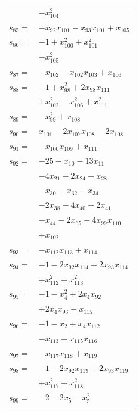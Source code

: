 \begin{longtable}{@{}r@{\;}l@{}}
 & \(\displaystyle -x_{104}^{2}\) \\[3pt]
\(s_{85}=\) & \(\displaystyle -x_{92}x_{101} -x_{93}x_{101} +x_{105}\) \\[3pt]
\(s_{86}=\) & \(\displaystyle -1 +x_{100}^{2} +x_{101}^{2}\) \\
 & \(\displaystyle -x_{105}^{2}\) \\[3pt]
\(s_{87}=\) & \(\displaystyle -x_{102} -x_{102}x_{103} +x_{106}\) \\[3pt]
\(s_{88}=\) & \(\displaystyle -1 +x_{98}^{2} +2x_{98}x_{111}\) \\
 & \(\displaystyle +x_{102}^{2} -x_{106}^{2} +x_{111}^{2}\) \\[3pt]
\(s_{89}=\) & \(\displaystyle -x_{99}^{2} +x_{108}\) \\[3pt]
\(s_{90}=\) & \(\displaystyle x_{101} -2x_{107}x_{108} -2x_{108}\) \\[3pt]
\(s_{91}=\) & \(\displaystyle -x_{100}x_{109} +x_{111}\) \\[3pt]
\(s_{92}=\) & \(\displaystyle -25 -x_{10} -13x_{11}\) \\
 & \(\displaystyle -4x_{21} -2x_{24} -x_{28}\) \\
 & \(\displaystyle -x_{30} -x_{32} -x_{34}\) \\
 & \(\displaystyle -2x_{38} -4x_{40} -2x_{41}\) \\
 & \(\displaystyle -x_{44} -2x_{65} -4x_{99}x_{110}\) \\
 & \(\displaystyle +x_{102}\) \\[3pt]
\(s_{93}=\) & \(\displaystyle -x_{112}x_{113} +x_{114}\) \\[3pt]
\(s_{94}=\) & \(\displaystyle -1 -2x_{92}x_{114} -2x_{93}x_{114}\) \\
 & \(\displaystyle +x_{112}^{2} +x_{113}^{2}\) \\[3pt]
\(s_{95}=\) & \(\displaystyle -1 -x_{4}^{2} +2x_{4}x_{92}\) \\
 & \(\displaystyle +2x_{4}x_{93} -x_{115}\) \\[3pt]
\(s_{96}=\) & \(\displaystyle -1 -x_{2} +x_{4}x_{112}\) \\
 & \(\displaystyle -x_{113} -x_{115}x_{116}\) \\[3pt]
\(s_{97}=\) & \(\displaystyle -x_{117}x_{118} +x_{119}\) \\[3pt]
\(s_{98}=\) & \(\displaystyle -1 -2x_{92}x_{119} -2x_{93}x_{119}\) \\
 & \(\displaystyle +x_{117}^{2} +x_{118}^{2}\) \\[3pt]
\(s_{99}=\) & \(\displaystyle -2 -2x_{5} -x_{5}^{2}\) \\

\end{longtable}
